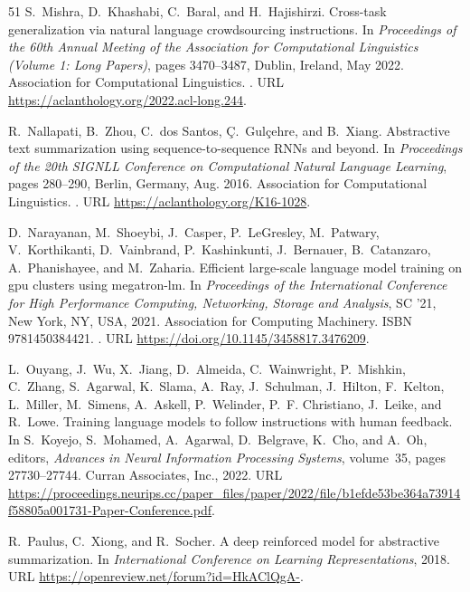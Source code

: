 \begin{thebibliography}{51}
S.~Mishra, D.~Khashabi, C.~Baral, and H.~Hajishirzi.
\newblock Cross-task generalization via natural language crowdsourcing
  instructions.
\newblock In \emph{Proceedings of the 60th Annual Meeting of the Association
  for Computational Linguistics (Volume 1: Long Papers)}, pages 3470--3487,
  Dublin, Ireland, May 2022. Association for Computational Linguistics.
\newblock {}.
\newblock URL \url{https://aclanthology.org/2022.acl-long.244}.

R.~Nallapati, B.~Zhou, C.~dos Santos, {\c{C}}.~Gul{\c{c}}ehre, and B.~Xiang.
\newblock Abstractive text summarization using sequence-to-sequence {RNN}s and
  beyond.
\newblock In \emph{Proceedings of the 20th {SIGNLL} Conference on Computational
  Natural Language Learning}, pages 280--290, Berlin, Germany, Aug. 2016.
  Association for Computational Linguistics.
\newblock {}.
\newblock URL \url{https://aclanthology.org/K16-1028}.

D.~Narayanan, M.~Shoeybi, J.~Casper, P.~LeGresley, M.~Patwary, V.~Korthikanti,
  D.~Vainbrand, P.~Kashinkunti, J.~Bernauer, B.~Catanzaro, A.~Phanishayee, and
  M.~Zaharia.
\newblock Efficient large-scale language model training on gpu clusters using
  megatron-lm.
\newblock In \emph{Proceedings of the International Conference for High
  Performance Computing, Networking, Storage and Analysis}, SC '21, New York,
  NY, USA, 2021. Association for Computing Machinery.
\newblock ISBN 9781450384421.
\newblock {}.
\newblock URL \url{https://doi.org/10.1145/3458817.3476209}.

L.~Ouyang, J.~Wu, X.~Jiang, D.~Almeida, C.~Wainwright, P.~Mishkin, C.~Zhang,
  S.~Agarwal, K.~Slama, A.~Ray, J.~Schulman, J.~Hilton, F.~Kelton, L.~Miller,
  M.~Simens, A.~Askell, P.~Welinder, P.~F. Christiano, J.~Leike, and R.~Lowe.
\newblock Training language models to follow instructions with human feedback.
\newblock In S.~Koyejo, S.~Mohamed, A.~Agarwal, D.~Belgrave, K.~Cho, and A.~Oh,
  editors, \emph{Advances in Neural Information Processing Systems}, volume~35,
  pages 27730--27744. Curran Associates, Inc., 2022.
\newblock URL
  \url{https://proceedings.neurips.cc/paper_files/paper/2022/file/b1efde53be364a73914f58805a001731-Paper-Conference.pdf}.

R.~Paulus, C.~Xiong, and R.~Socher.
\newblock A deep reinforced model for abstractive summarization.
\newblock In \emph{International Conference on Learning Representations}, 2018.
\newblock URL \url{https://openreview.net/forum?id=HkAClQgA-}.


\end{thebibliography}
